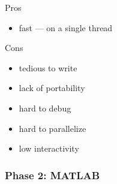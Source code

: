 \documentclass[
    xcolor={svgnames,dvipsnames},
    hyperref={colorlinks, citecolor=DeepPink4, linkcolor=DarkRed, urlcolor=DarkBlue}
    ]{beamer}  %
\newcommand{\1}{\mathbbm 1}
\begin{document}
\begin{frame}
    

    Pros

    \begin{itemize}
        \item fast  --- on a single thread
    \end{itemize}


    \vspace{0.5em}

    Cons

    \begin{itemize}
        \item tedious to write
        \item lack of portability
        \item hard to debug
        \item hard to parallelize
        \item low interactivity
    \end{itemize}

\end{frame}



\begin{frame}
    \frametitle{Phase 2: MATLAB}

    
    \begin{figure}
       \begin{center} %
       \end{center}
    \end{figure}


\end{frame}
\end{document}
